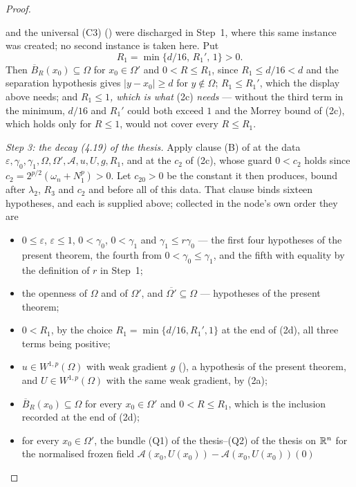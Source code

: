 \begin{proof}
\begin{enumerate}
   and the universal (C3)
  () were discharged in Step~1, where this same
  instance was created; no second instance is taken here.  Put
  \[
  R_1=\min\{d/16,\,R_1',\,1\}>0 .
  \]
  Then $\overline B_R(x_0)\subseteq\Omega$ for
  $x_0\in\Omega'$ and $0<R\le R_1$, since $R_1\le d/16<d$ and the separation
  hypothesis gives $|y-x_0|\ge d$ for $y\notin\Omega$; $R_1\le R_1'$, which the
  display above needs; and \emph{$R_1\le1$, which is what} (2c)
  \emph{needs} --- without the third term in the minimum, $d/16$ and $R_1'$
  could both exceed $1$ and the Morrey bound of (2c), which holds only for
  $R\le1$, would not cover every $R\le R_1$.
\end{enumerate}

\emph{Step 3: the decay (4.19) of the thesis.}  Apply clause (B) of
 at the data
$\varepsilon,\gamma_0,\gamma_1,\Omega,\Omega',\mathcal A,u,U,g,R_1$, and at the
$c_2$ of (2c), whose guard $0<c_2$ holds since
$c_2=2^{p/2}(\omega_n+N_1^p)>0$.  Let $c_{20}>0$ be the constant it then
produces, bound after $\lambda_2$, $R_3$ and $c_2$ and before all of this data.
That clause binds sixteen hypotheses, and each
is supplied above; collected in the node's own order they are
\begin{itemize}
\item $0\le\varepsilon$, $\varepsilon\le1$, $0<\gamma_0$, $0<\gamma_1$ and
  $\gamma_1\le r\gamma_0$ --- the first four hypotheses of the present theorem,
  the fourth from $0<\gamma_0\le\gamma_1$, and the fifth with equality by the
  definition of $r$ in Step~1;
\item the openness of $\Omega$ and of $\Omega'$, and
  $\overline{\Omega'}\subseteq\Omega$ --- hypotheses of the present theorem;
\item $0<R_1$, by the choice $R_1=\min\{d/16,R_1',1\}$ at the end of (2d), all
  three terms being positive;
\item $u\in W^{1,p}(\Omega)$ with weak gradient $g$ (), a
  hypothesis of the present theorem, and $U\in W^{1,p}(\Omega)$ with the same
  weak gradient, by (2a);
\item $\overline B_R(x_0)\subseteq\Omega$ for every $x_0\in\Omega'$ and
  $0<R\le R_1$, which is the inclusion recorded at the end of (2d);
\item for every $x_0\in\Omega'$, the bundle
  (Q1) of the thesis--(Q2) of the thesis on $\mathbb{R}^n$ for the normalised frozen field
  $\mathcal A(x_0,U(x_0))-\mathcal A(x_0,U(x_0))(0)$

\end{itemize}
\end{proof}
